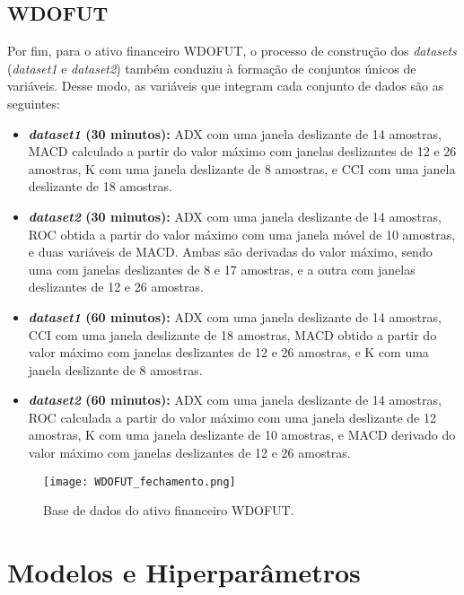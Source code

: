\subsection{WDOFUT}
Por fim,  para o ativo financeiro WDOFUT, o processo de construção dos \textit{datasets} (\textit{dataset1} e \textit{dataset2}) também conduziu à formação de conjuntos únicos de variáveis. Desse modo, as variáveis que integram cada conjunto de dados são as seguintes:
\begin{itemize}
	\item \textbf{\textit{dataset1} (30 minutos):} \ac{ADX} com uma janela deslizante de 14 amostras, \ac{MACD} calculado a partir do valor máximo com janelas deslizantes de 12 e 26 amostras, \ac{K} com uma janela deslizante de 8 amostras, e \ac{CCI} com uma janela deslizante de 18 amostras.
	
	\item \textbf{\textit{dataset2} (30 minutos):} \ac{ADX} com uma janela deslizante de 14 amostras, \ac{ROC} obtida a partir do valor máximo com uma janela móvel de 10 amostras, e duas variáveis de \ac{MACD}. Ambas são derivadas do valor máximo, sendo uma com janelas deslizantes de 8 e 17 amostras, e a outra com janelas deslizantes de 12 e 26 amostras.
	
	\item \textbf{\textit{dataset1} (60 minutos):} \ac{ADX} com uma janela deslizante de 14 amostras, \ac{CCI} com uma janela deslizante de 18 amostras, \ac{MACD} obtido a partir do valor máximo com janelas deslizantes de 12 e 26 amostras, e \ac{K} com uma janela deslizante de 8 amostras.
	
	\item \textbf{\textit{dataset2} (60 minutos):} \ac{ADX} com uma janela deslizante de 14 amostras, \ac{ROC} calculada a partir do valor máximo com uma janela deslizante de 12 amostras, \ac{K} com uma janela deslizante de 10 amostras, e \ac{MACD} derivado do valor máximo com janelas deslizantes de 12 e 26 amostras.
\end{itemize}

\begin{figure}[htbp]
	\caption{Base de dados do ativo financeiro WDOFUT.}
	\centering
	\texttt{[image: WDOFUT\_fechamento.png]} 
	\label{fig:WDOFUT_fechamento}
\end{figure}


\section{Modelos e Hiperparâmetros}
\label{sec:modelos_parametros_resultados}
	

